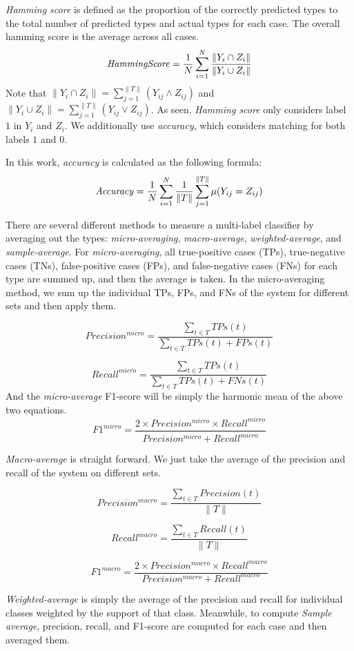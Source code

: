 \textit{Hamming score} is defined as the proportion of the correctly predicted types to the total number of predicted types and actual types for each case. The overall hamming score is the average across all cases.
%
$$
\text{\textit{HammingScore}} = \frac{1}{N}\sum_{i=1}^{N} \frac{\|Y_i \cap Z_i\|}{\|Y_i \cup Z_i\|}
$$
%
Note that $\|Y_i \cap Z_i\| = \sum_{j=1}^{\|T\|} (Y_{ij} \wedge Z_{ij})$ and $\|Y_i \cup Z_i\| = \sum_{j=1}^{\|T\|} (Y_{ij} \vee Z_{ij})$. 
As seen, \textit{Hamming score} only considers label $1$ in $Y_i$ and $Z_i$. We additionally use \textit{accuracy}, which considers matching for both labels $1$ and $0$.

In this work, \textit{accuracy} is calculated as the following formula:
$$
\text{\textit{Accuracy}} = \frac{1}{N} \sum_{i=1}^{N} \frac{1}{\|T\|} \sum_{j=1}^{\|T\|} \mu(Y_{ij} = Z_{ij})
$$

There are several different methods to measure a multi-label classifier by averaging out the types: \textit{micro-averaging}, \textit{macro-average}, \textit{weighted-average}, and \textit{sample-average}. For \textit{micro-averaging}, all true-positive cases (TPs), true-negative cases (TNs), false-positive cases (FPs), and false-negative cases (FNs) for each type are summed up, and then the average is taken. In the micro-averaging method, we sum up the individual TPs, FPs, and FNs of the system for different sets and then apply them. 

$$
Precision^{micro} = \frac{ \sum_{t \in T} TPs(t) }{ \sum_{t \in T} TPs(t) + FPs(t) }
$$

$$
Recall^{micro} = \frac{ \sum_{t \in T} TPs(t) }{ \sum_{t \in T} TPs(t) + FNs(t) }
$$
And the \textit{micro-average} F1-score will be simply the harmonic mean of the above two equations.
$$
F1^{micro} = \frac{2 \times Precision^{micro} \times Recall^{micro}}{Precision^{micro} + Recall^{micro}}
$$

\textit{Macro-average} is straight forward. We just take the average of the precision and recall of the system on different sets.

$$
Precision^{macro} = \frac{ \sum_{t \in T} Precision(t) }{ \|T\| }
$$

$$
Recall^{macro} = \frac{ \sum_{t \in T} Recall(t) }{ \|T\| }
$$

$$
F1^{macro} = \frac{2 \times Precision^{macro} \times Recall^{macro}}{Precision^{macro} + Recall^{macro}}
$$

\textit{Weighted-average} is simply the average of the precision and recall for individual classes weighted by the support of that class. Meanwhile, to compute \textit{Sample average}, precision, recall, and F1-score are computed for each case and then averaged them.